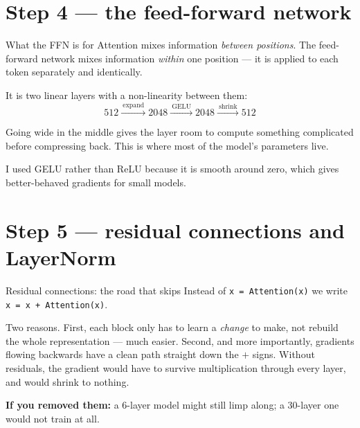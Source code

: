 \documentclass[11pt]{report}
\newcommand{\p}[1]{\texttt{#1}}
\begin{document}
\section{Step 4 --- the feed-forward network}

\begin{concept}{What the FFN is for}
Attention mixes information \emph{between positions}. The feed-forward network
mixes information \emph{within} one position --- it is applied to each token
separately and identically.

It is two linear layers with a non-linearity between them:
\[ 512 \xrightarrow{\ \text{expand}\ } 2048 \xrightarrow{\ \text{GELU}\ } 2048 \xrightarrow{\ \text{shrink}\ } 512 \]

Going wide in the middle gives the layer room to compute something complicated
before compressing back. This is where most of the model's parameters live.

I used GELU rather than ReLU because it is smooth around zero, which gives
better-behaved gradients for small models.
\end{concept}

\section{Step 5 --- residual connections and LayerNorm}

\begin{concept}{Residual connections: the road that skips}
Instead of \p{x = Attention(x)} we write \p{x = x + Attention(x)}.

Two reasons. First, each block only has to learn a \emph{change} to make, not
rebuild the whole representation --- much easier. Second, and more importantly,
gradients flowing backwards have a clean path straight down the $+$ signs. Without
residuals, the gradient would have to survive multiplication through every layer,
and would shrink to nothing.

\textbf{If you removed them:} a 6-layer model might still limp along; a 30-layer
one would not train at all.
\end{concept}
\end{document}
